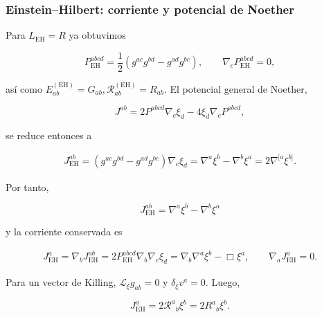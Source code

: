 \documentclass{beamer}
\newcommand{\CompactDisplaySpacing}{%
  \setlength{\abovedisplayskip}{2pt plus 1pt minus 1pt}%
  \setlength{\belowdisplayskip}{2pt plus 1pt minus 1pt}%
  \setlength{\abovedisplayshortskip}{0pt plus 1pt}%
  \setlength{\belowdisplayshortskip}{1pt plus 1pt}%
}
\begin{document}
\begin{frame}[label=nav-frame-046]
	\frametitle{Einstein--Hilbert: corriente y potencial de Noether}
\linespread{.96}\selectfont\CompactDisplaySpacing
	\scriptsize

	Para \(L_{\mathrm{EH}}=R\) ya obtuvimos

	\[
	P_{\mathrm{EH}}^{abcd}
	=
	\frac12
	\left(
	g^{ac}g^{bd}-g^{ad}g^{bc}
	\right),
	\qquad
	\nabla_cP_{\mathrm{EH}}^{abcd}=0,
	\]

	así como $E_{ab}^{(\mathrm{EH})}=G_{ab}, \mathcal R_{ab}^{(\mathrm{EH})}=R_{ab}$. El potencial general de Noether,

	\[
	J^{ab}
	=
	2P^{abcd}\nabla_c\xi_d
	-
	4\xi_d\nabla_cP^{abcd},
	\]

	se reduce entonces a

	\begin{align*}
		J_{\mathrm{EH}}^{ab}
		=
		\left(
		g^{ac}g^{bd}-g^{ad}g^{bc}
		\right)\nabla_c\xi_d
		=
		\nabla^a\xi^b-\nabla^b\xi^a
		=
		2\nabla^{[a}\xi^{b]}.
	\end{align*}

	Por tanto,

	\[
	\boxed{
		J_{\mathrm{EH}}^{ab}
		=
		\nabla^a\xi^b-\nabla^b\xi^a
	}
	\]

	y la corriente conservada es

	\begin{align*}
		J_{\mathrm{EH}}^a
		=
		\nabla_bJ_{\mathrm{EH}}^{ab}
		=
		2P_{\mathrm{EH}}^{abcd}
		\nabla_b\nabla_c\xi_d
		=
		\nabla_b\nabla^a\xi^b-\Box\xi^a,
		\qquad
		\nabla_aJ_{\mathrm{EH}}^a=0.
	\end{align*}

	Para un vector de Killing,
	\(\mathcal L_\xi g_{ab}=0\) y
	\(\delta_\xi v^a=0\). Luego,

	\[
	\boxed{
		J_{\mathrm{EH}}^a
		=
		2\mathcal R^a{}_b\xi^b
		=
		2R^a{}_b\xi^b.
	}
	\]

\end{frame}
\end{document}
